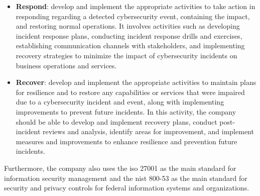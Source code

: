\begin{multicols}{2}
\begin{itemize}
            \item \textbf{Respond}: develop and implement the appropriate activities to take action in responding
                  regarding a detected cybersecurity event, containing the impact, and restoring normal operations.
                  It involves activities such as developing incident response plans, conducting incident response
                  drills and exercises, establishing communication channels with stakeholders, and implementing
                  recovery strategies to minimize the impact of cybersecurity incidents on business operations and
                  services.
            \item \textbf{Recover}: develop and implement the appropriate activities to maintain plans for
                  resilience and to restore any capabilities or services that were impaired due to a cybersecurity
                  incident and event, along with implementing improvements to prevent future incidents. In this
                  activity,  the company should be able to develop and implement recovery plans, conduct
                  post-incident reviews and analysis, identify areas for improvement, and implement measures and
                  improvements to enhance resilience and prevention future incidents.
      \end{itemize}
      Furthermore, the company also uses the \acrshort{iso} 27001 as the main standard for information security
      management and the \acrshort{nist} 800-53 as the main standard for security and privacy controls for federal
      information systems and organizations.

\end{multicols}
